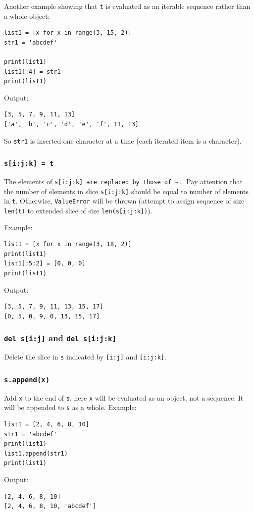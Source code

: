 \documentclass[12pt]{book}
\begin{document}
Another example showing that \texttt{t} is evaluated as an iterable sequence rather than a whole object:
\begin{verbatim}
list1 = [x for x in range(3, 15, 2)]
str1 = 'abcdef'

print(list1)
list1[:4] = str1
print(list1)
\end{verbatim}
Output:
\begin{verbatim}
[3, 5, 7, 9, 11, 13]
['a', 'b', 'c', 'd', 'e', 'f', 11, 13]
\end{verbatim}
So \texttt{str1} is inserted one character at a time (each iterated item is a character).

\subsubsection{\texttt{s[i:j:k] = t}}
\label{sec:org5645119}
The elements of \texttt{s[i:j:k] are replaced by those of \textasciitilde{}t}. Pay attention that the number of elements in slice \texttt{s[i:j:k]} should be equal to number of elements in \texttt{t}. Otherwise, \texttt{ValueError} will be thrown (attempt to assign sequence of size \texttt{len(t)} to extended slice of size \texttt{len(s[i:j:k])}).

Example:
\begin{verbatim}
list1 = [x for x in range(3, 18, 2)]
print(list1)
list1[:5:2] = [0, 0, 0]
print(list1)
\end{verbatim}
Output:
\begin{verbatim}
[3, 5, 7, 9, 11, 13, 15, 17]
[0, 5, 0, 9, 0, 13, 15, 17]
\end{verbatim}

\subsubsection{\texttt{del s[i:j]} and \texttt{del s[i:j:k]}}
\label{sec:orgee06a22}
Delete the slice in \texttt{s} indicated by \texttt{[i:j]} and \texttt{[i:j:k]}.
\subsubsection{\texttt{s.append(x)}}
\label{sec:org545bf8c}
Add \texttt{x} to the end of \texttt{s}, here \texttt{x} will be evaluated as an object, not a sequence. It will be appended to \texttt{s} as a whole. Example:
\begin{verbatim}
list1 = [2, 4, 6, 8, 10]
str1 = 'abcdef'
print(list1)
list1.append(str1)
print(list1)
\end{verbatim}
Output:
\begin{verbatim}
[2, 4, 6, 8, 10]
[2, 4, 6, 8, 10, 'abcdef']
\end{verbatim}
\end{document}
